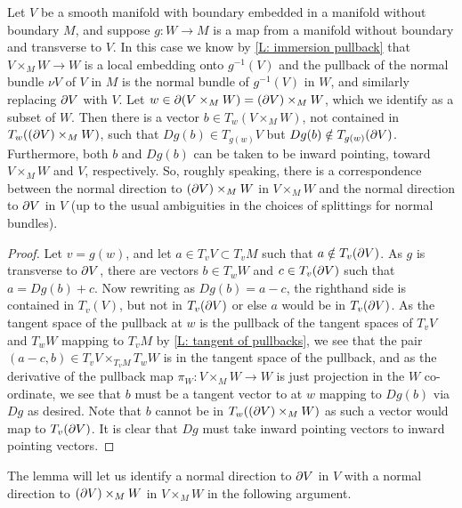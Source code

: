 \begin{lemma}\label{L: pullback boundary normal}
	Let $V$ be a smooth manifold with boundary embedded in a manifold without boundary $M$, and suppose $g \colon W \to M$ is a map from a manifold without boundary and transverse to $V$.
	In this case we know by \cref{L: immersion pullback} that $V \times_M W \to W$ is a local embedding onto $g^{-1}(V)$ and the pullback of the normal bundle $\nu V$ of $V$ in $M$ is the normal bundle of $g^{-1}(V)$ in $W$, and similarly replacing $\partial V$ with $V$.
	Let $w\in \partial (V \times_M W) = (\partial V) \times_M W$, which we identify as a subset of $W$.
	Then there is a vector $b \in T_w(V \times_M W)$, not contained in $T_w((\partial V) \times_M W)$, such that $Dg(b) \in T_{g(w)}V$ but $Dg(b) \notin T_{g(w)}(\partial V)$. Furthermore, both $b$ and $Dg(b)$ can be taken to be inward pointing, toward $V \times_M W$ and $V$, respectively.
	So, roughly speaking, there is a correspondence between the normal direction to $(\partial V) \times_M W$ in $V \times_M W$ and the normal direction to $\partial V$ in $V$ (up to the usual ambiguities in the choices of splittings for normal bundles).
\end{lemma}
\begin{proof}
Let $v = g(w)$, and let $a \in T_v V \subset T_v M$ such that $a \notin T_v (\partial V)$.
As $g$ is transverse to $\partial V$, there are vectors $b \in T_w W$ and $c \in T_v(\partial V)$ such that $a= Dg(b) + c$.
Now rewriting as $Dg(b) = a - c$, the righthand side is contained in $T_v(V)$, but not in $T_v(\partial V)$ or else $a$ would be in $T_v(\partial V)$.
As the tangent space of the pullback at $w$ is the pullback of the tangent spaces of $T_v V$ and $T_w W$ mapping to $T_v M$ by \cref{L: tangent of pullbacks}, we see that the pair $(a-c, b) \in T_v V \times_{T_v M} T_w W$ is in the tangent space of the pullback, and as the derivative of the pullback map $\pi_W \colon V \times_M W \to W$ is just projection in the $W$ co-ordinate, we see that $b$ must be a tangent vector to at $w$ mapping to $Dg(b)$ via $Dg$ as desired.
Note that $b$ cannot be in $T_w((\partial V) \times_M W)$ as such a vector would map to $T_v (\partial V)$.
It is clear that $Dg$ must take inward pointing vectors to inward pointing vectors.
\end{proof}

The lemma will let us identify a normal direction to $\partial V$ in $V$ with a normal direction to $(\partial V) \times_M W$ in $V \times_M W$ in the following argument.

